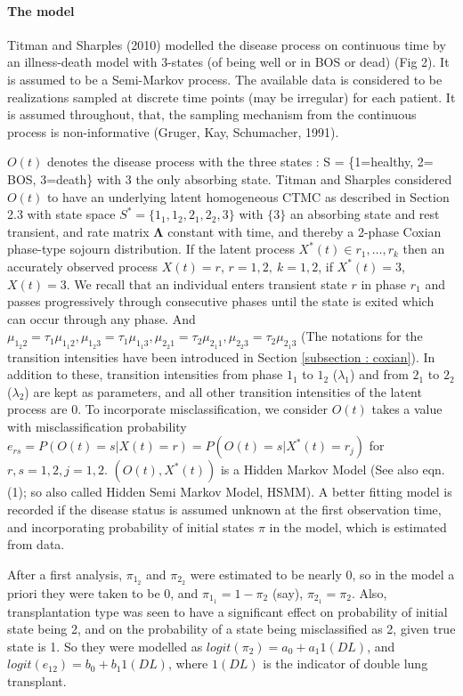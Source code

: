 \documentclass{uwstat572}
\begin{document}
\paragraph{The model} Titman and Sharples (2010) modelled the disease process on continuous time by an illness-death model with 3-states (of being well or in BOS or dead) (Fig 2). It is assumed to be a Semi-Markov process. The available data is considered to be realizations sampled at discrete time points (may be irregular) for each patient. It is assumed throughout, that, the sampling mechanism from the continuous process is non-informative (Gruger, Kay, Schumacher, 1991).

$O(t)$ denotes the disease process with the three states : S = \{1=healthy, 2= BOS, 3=death\} with $3$ the only absorbing state. Titman and Sharples considered $O(t)$ to have an underlying latent homogeneous CTMC as described in Section 2.3 with state space $S^*=\{1_1,1_2,2_1,2_2,3\}$ with $\{3\}$ an absorbing state and rest transient, and rate matrix $\bm{\Lambda}$ constant with time, and thereby a 2-phase Coxian phase-type sojourn distribution.  If the latent process $X^*(t) \in {r_1,\ldots, r_k}$ then an accurately observed process $X(t) = r$, $r=1,2,~k=1,2$, if $X^*(t)=3$, $X(t)=3$. We recall that an individual enters transient state $r$ in phase $r_1$ and passes progressively through consecutive phases until the state is exited which can occur through any phase. And $\mu_{1_2 2} = \tau_1 \mu_{1_1 2}, \mu_{1_2 3} = \tau_1 \mu_{1_1 3}, \mu_{2_2 1} = \tau_2 \mu_{2_1 1}, \mu_{2_2 3} = \tau_2 \mu_{2_1 3} $ (The notations for the transition intensities have been introduced in Section \ref{subsection : coxian}). In addition to these, transition intensities from phase $1_1$ to $1_{2}$ ($\lambda_1$) and from $2_1$ to $2_{2}$ ($\lambda_2$) are kept as parameters, and all other transition intensities of the latent process are 0. To incorporate misclassification, we consider $O(t)$ takes a value with misclassification probability $e_{rs}=P(O(t)=s|X(t) =r)=P(O(t)=s|X^* (t) =r_j)$ for $r,s =1,2, j=1,2$. $(O(t), X^*(t))$ is a Hidden Markov Model (See also eqn. (1); so also called Hidden Semi Markov Model, HSMM). A better fitting model is recorded if the disease status is assumed unknown at the first observation time, and incorporating probability of initial states $\pi$ in the model, which is estimated from data.

After a first analysis, $\pi_{1_2}$ and $\pi_{2_2}$ were estimated to be nearly $0$, so in the model a priori they were taken to be $0$, and $\pi_{1_1}=1-\pi_2$ (say), $\pi_{2_1}=\pi_2$.  Also, transplantation type was seen to have a significant effect on probability of initial state being 2, and on the probability of a state being misclassified as 2, given true state is 1. So they were  modelled as $logit(\pi_2) = a_0 + a_1 1(DL)$, and $logit(e_{12})=b_0 + b_1 1(DL)$, where $1(DL)$ is the indicator of double lung transplant.
\end{document}
